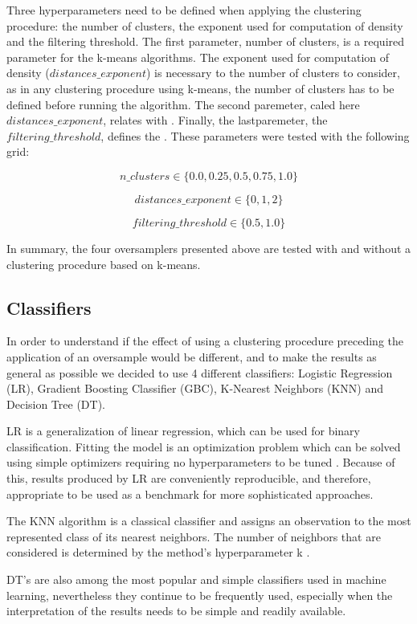 \documentclass[parskip=full]{scrartcl}
\begin{document}
Three hyperparameters need to be defined when applying the clustering 
procedure: the number of clusters, the exponent used for computation of density 
and the filtering threshold. The first parameter, number of clusters, is a 
required parameter for the k-means algorithms. The exponent used for 
computation of density ($distances\_exponent$) is necessary to the number of 
clusters to consider, as in any clustering procedure using k-means, the number 
of clusters has to be defined before running the algorithm. The second 
paremeter, caled here $distances\_exponent$, relates with . Finally, the 
lastparemeter, the $filtering\_threshold$, defines the . These parameters were 
tested with the following grid:

$$n\_clusters \in \{0.0, 0.25,0.5,0.75, 1.0\}$$

$$distances\_exponent \in \{0, 1, 2\}$$

$$filtering\_threshold \in \{0.5, 1.0\}$$

In summary, the four oversamplers presented above are tested with and without a 
clustering procedure based on k-means.

\subsection{Classifiers}

In order to understand if the effect of using a clustering procedure preceding 
the application of an oversample would be different, and to make the results as 
general as possible we decided to use 4 different classifiers: Logistic 
Regression (LR), Gradient Boosting Classifier (GBC), K-Nearest Neighbors (KNN) 
and Decision Tree (DT). 

LR is a generalization of linear regression, which can be used for binary 
classification. Fitting the model is an optimization problem which can be 
solved using simple optimizers requiring no hyperparameters to be tuned 
\cite{McCullagh1989}. Because of this, results produced by LR are conveniently 
reproducible, and therefore, appropriate to be used as a benchmark for more 
sophisticated approaches.

The KNN algorithm is a classical classifier and assigns an observation to the 
most represented class of its nearest neighbors. The number of neighbors that 
are considered is determined by the method’s hyperparameter k \cite{Fix1989}. 

DT’s \cite{Breiman1984} are also among the most popular and simple classifiers 
used in machine learning, nevertheless they continue to be frequently used, 
especially when the interpretation of the results needs to be simple and 
readily available. 
\end{document}

